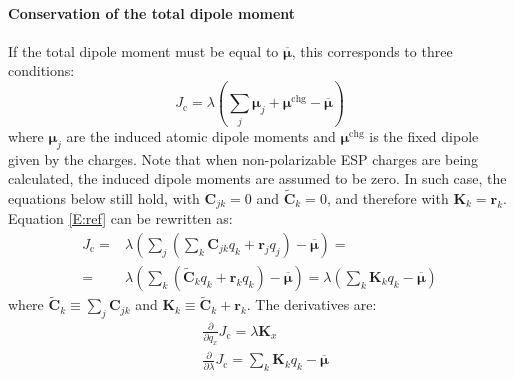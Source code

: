 \documentclass[a4paper]{report}
\newcommand{\bs}{\boldsymbol}
\newcommand{\mr}{\mathrm}
\begin{document}
\paragraph{Conservation of the total dipole moment}

If the total dipole moment must be equal to $\overline{\bs{\mu}}$, this corresponds
to three conditions:
\begin{equation}
J_\mr{c} = \lambda \left(\sum_j \bs{\mu}_j + \bs{\mu}^\mr{chg} - \overline{\bs{\mu}}
\right) 
\label{E:ref}
\end{equation}
where $\bs{\mu}_j$ are the induced atomic dipole moments and $\bs{\mu}^\mr{chg}$ is the
fixed dipole given by the charges. Note that when non-polarizable ESP charges are
being calculated, the induced dipole moments are assumed to be zero. In such case,
the equations below still hold, with $\bs{C}_{jk} = 0$ and $\tilde{\bs{C}}_k = 0$,
and therefore with $\bs{K}_k = \bs{r}_k$. Equation \ref{E:ref} can be rewritten as:
\begin{align}
J_\mr{c} =& \lambda \left(\sum_j \left(\sum_k \bs{C}_{jk} q_k + 
\bs{r}_j q_j\right) - \overline{\bs{\mu}} \right) = \nonumber \\
=& \lambda \left(\sum_k \left( \tilde{\bs{C}}_k q_k + \bs{r}_k q_k \right)-
\overline{\bs{\mu}} \right) = \lambda \left(\sum_k \bs{K}_k q_k -
\overline{\bs{\mu}} \right)
\end{align}
where $\tilde{\bs{C}}_k \equiv \sum_j \bs{C}_{jk}$ and $\bs{K}_k \equiv
\tilde{\bs{C}}_k + \bs{r}_k$. The derivatives are:
\begin{align}
&\frac{\partial}{\partial q_x} J_\mr{c} = \lambda \bs{K}_x \\
&\frac{\partial}{\partial \lambda} J_\mr{c} = \sum_k \bs{K}_k q_k -
\overline{\bs{\mu}}
\end{align}
\end{document}
